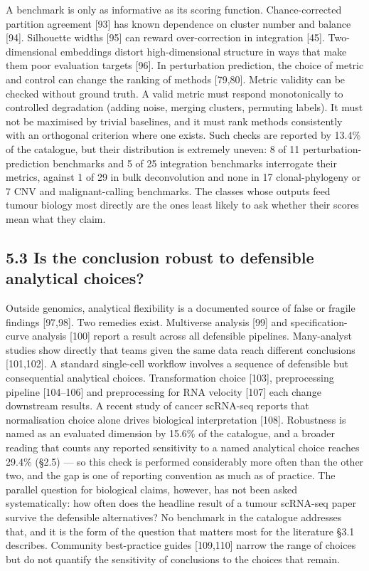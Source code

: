 \documentclass[11pt]{article}
\begin{document}
A benchmark is only as informative as its scoring function.
Chance-corrected partition agreement {[}93{]} has known dependence on
cluster number and balance {[}94{]}. Silhouette widths {[}95{]} can
reward over-correction in integration {[}45{]}. Two-dimensional
embeddings distort high-dimensional structure in ways that make them
poor evaluation targets {[}96{]}. In perturbation prediction, the choice
of metric and control can change the ranking of methods {[}79,80{]}.
Metric validity can be checked without ground truth. A valid metric must
respond monotonically to controlled degradation (adding noise, merging
clusters, permuting labels). It must not be maximised by trivial
baselines, and it must rank methods consistently with an orthogonal
criterion where one exists. Such checks are reported by 13.4\% of the
catalogue, but their distribution is extremely uneven: 8 of 11
perturbation-prediction benchmarks and 5 of 25 integration benchmarks
interrogate their metrics, against 1 of 29 in bulk deconvolution and
none in 17 clonal-phylogeny or 7 CNV and malignant-calling benchmarks.
The classes whose outputs feed tumour biology most directly are the ones
least likely to ask whether their scores mean what they claim.

\subsection{5.3 Is the conclusion robust to defensible analytical choices?}\label{is-the-conclusion-robust-to-defensible-analytical-choices}

Outside genomics, analytical flexibility is a documented source of false
or fragile findings {[}97,98{]}. Two remedies exist. Multiverse analysis
{[}99{]} and specification-curve analysis {[}100{]} report a result
across all defensible pipelines. Many-analyst studies show directly that
teams given the same data reach different conclusions {[}101,102{]}. A
standard single-cell workflow involves a sequence of defensible but
consequential analytical choices. Transformation choice {[}103{]},
preprocessing pipeline {[}104--106{]} and preprocessing for RNA velocity
{[}107{]} each change downstream results. A recent study of cancer
scRNA-seq reports that normalisation choice alone drives biological
interpretation {[}108{]}. Robustness is named as an evaluated dimension
by 15.6\% of the catalogue, and a broader reading that counts any
reported sensitivity to a named analytical choice reaches 29.4\% (§2.5)
--- so this check is performed considerably more often than the other
two, and the gap is one of reporting convention as much as of practice.
The parallel question for biological claims, however, has not been asked
systematically: how often does the headline result of a tumour scRNA-seq
paper survive the defensible alternatives? No benchmark in the catalogue
addresses that, and it is the form of the question that matters most for
the literature §3.1 describes. Community best-practice guides
{[}109,110{]} narrow the range of choices but do not quantify the
sensitivity of conclusions to the choices that remain.
\end{document}
